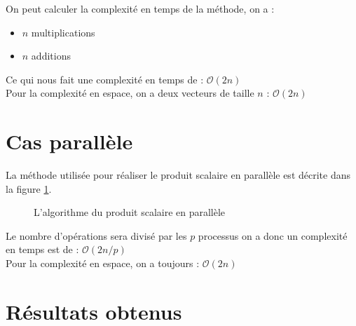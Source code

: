 \documentclass[a4paper]{article}
\begin{document}
On peut calculer la complexité en temps de la méthode, on a :
\begin{itemize}
\item $n$ multiplications
\item $n$ additions	
\end{itemize}
Ce qui nous fait une complexité en temps de : \textbf{$\mathcal{O}(2n)$} \\
Pour la complexité en espace, on a deux vecteurs de taille $n$ : \textbf{$\mathcal{O}(2n)$}


\section{Cas parallèle}

La méthode utilisée pour réaliser le produit scalaire en parallèle est décrite dans la figure \ref{fig:algo_ps_parallele}.

\begin{figure}[h]
	\caption{L'algorithme du produit scalaire en parallèle}%
	\label{fig:algo_ps_parallele}%
\end{figure}

Le nombre d'opérations sera divisé par les $p$ processus on a donc un complexité en temps est de : \textbf{$\mathcal{O}(2n / p)$} \\
Pour la complexité en espace, on a toujours : \textbf{$\mathcal{O}(2n)$}

\section{Résultats obtenus}
\end{document}
